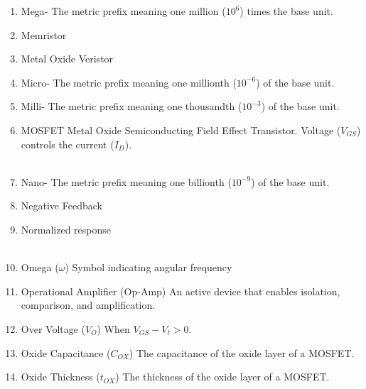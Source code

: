 \documentclass{IEEEtran}
\begin{document}
\begin{enumerate}
\\
\item Mega-
  \subitem The metric prefix meaning one million ($10^{6}$) times the base unit.\\
\item Memristor
  \subitem \\
\item Metal Oxide Veristor
  \subitem \\
\item Micro-
  \subitem The metric prefix meaning one millionth ($10^{-6}$) of the base unit.\\
\item Milli-
  \subitem The metric prefix meaning one thousandth ($10^{-3}$) of the base unit.\\
\item MOSFET
  \subitem Metal Oxide Semiconducting Field Effect Transistor. Voltage ($V_{GS}$) controls the current ($I_D$). \\

\\
\item Nano-
  \subitem The metric prefix meaning one billionth ($10^{-9}$) of the base unit.\\
\item Negative Feedback
  \subitem \\
\item Normalized response
  \subitem \\ 

\\
\item Omega ($\omega$)
  \subitem Symbol indicating angular frequency\\
\item Operational Amplifier (Op-Amp)
  \subitem An active device that enables isolation, comparison, and amplification.\\
\item Over Voltage ($V_O$)
\subitem When $V_{GS}-V_t > 0$.
\item Oxide Capacitance ($C_{OX}$)
\subitem The capacitance of the oxide layer of a MOSFET. \\
\item Oxide Thickness ($t_{OX}$)
\subitem The thickness of the oxide layer of a MOSFET. \\ 



\end{enumerate}
\end{document}
